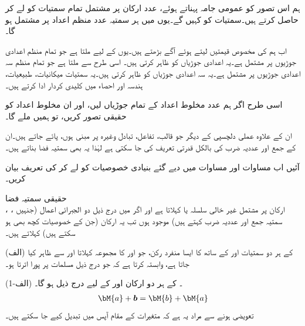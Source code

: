 ہم اس تصور کو عمومی جامہ پہناتے ہوئے،  عدد ارکان پر مشتمل تمام سمتیات کو لے کر   حاصل کرتے ہیں۔سمتیات کو  کہیں گے۔یوں  میں ہر سمتیہ  عدد منظم اعداد پر مشتمل ہو گا۔

اب ہم  کی مخصوص قیمتیں لیتے ہوئے آگے بڑھتے ہیں۔یوں  کے لیے  ملتا ہے جو تمام منظم اعدادی جوڑیوں پر مشتمل ہے۔یہ اعدادی جوڑیاں  کو ظاہر کرتی ہیں۔ اسی طرح  سے  ملتا ہے جو  تمام منظم سہ اعدادی جوڑیوں پر مشتمل ہے۔یہ سہ اعدادی جوڑیاں  کو ظاہر کرتی ہیں۔یہ سمتیات میکانیات، طبیعیات، ہندسہ اور احصاء میں کلیدی کردار ادا کرتے ہیں۔

اسی طرح اگر ہم   عدد مخلوط اعداد کے تمام جوڑیاں لیں، اور ان مخلوط اعداد کو حقیقی تصور کریں، تو ہمیں   ملے گا۔ 

ان کے علاوہ عملی دلچسپی کے دیگر   جو قالب، تفاعل، تبادل وغیرہ پر مبنی ہوں، پائے جاتے ہیں۔ان کے جمع اور عددیہ ضرب کی بالکل قدرتی تعریف کی جا سکتی ہے لہٰذا یہ بھی سمتیہ فضا بناتے ہیں۔     

آئیں اب مساوات  اور مساوات  میں دیے گئے  بنیادی خصوصیات کو لے کر   کی تعریف بیان کریں۔

\quad حقیقی سمتیہ فضا\\
، ،  ارکان پر مشتمل غیر خالی سلسلہ   یا  کہلاتا ہے اور اگر  میں درج ذیل دو الجبرائی اعمال (جنہیں سمتیہ جمع اور عددیہ ضرب کہتے ہیں) موجود ہوں تب یہ ارکان (جن کے خصوصیات کچھ بھی ہو سکتے ہیں)   کہلاتے ہیں۔

(الف)\quad {}  کے ہر دو سمتیات  اور  کے ساتھ  کا ایسا منفرد رکن، جو  اور  کا مجموعہ کہلاتا  اور  سے ظاہر کیا جاتا ہے،  وابستہ  کرتا ہے کہ جو درج ذیل مسلمات پر پورا اترتا ہو۔

(الف-1) \quad {}۔   کے ہر دو ارکان  اور  کے لیے درج ذیل ہو گا۔
\begin{align}
\bM{a}+\bm{b}=\bM{b}+\bM{a}
\end{align} 
تعویضی ہونے سے مراد یہ ہے کہ متغیرات کے مقام آپس میں تبدیل کیے جا سکتے ہیں۔

